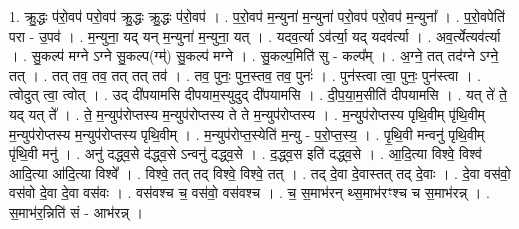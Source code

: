 \documentclass[17pt]{extarticle}
\begin{document}
1. क्रु॒द्धः प॑रो॒वप॑ परो॒वप॑ क्रु॒द्धः क्रु॒द्धः प॑रो॒वप॑ । . प॒रो॒वप॑ म॒न्युना॑ म॒न्युना॑ परो॒वप॑ परो॒वप॑ म॒न्युना᳚ । . प॒रो॒वपेति॑ परा - उ॒पव॑ । . म॒न्युना॒ यद् यन् म॒न्युना॑ म॒न्युना॒ यत् । . यदव॒र्त्या ऽव॑र्त्या॒ यद् यदव॑र्त्या । . अव॒र्त्येत्यव॑र्त्या । . सु॒कल्प॑ मग्ने ऽग्ने सु॒कल्प(ग्म्॑) सु॒कल्प॑ मग्ने । . सु॒कल्प॒मिति॑ सु - कल्प᳚म् । . अ॒ग्ने॒ तत् तद॑ग्ने ऽग्ने॒ तत् । . तत् तव॒ तव॒ तत् तत् तव॑ । . तव॒ पुनः॒ पुन॒स्तव॒ तव॒ पुनः॑ । . पुन॑स्त्वा त्वा॒ पुनः॒ पुन॑स्त्वा । . त्वोदुत् त्वा॒ त्वोत् । . उद् दी॑पयामसि दीपयाम॒स्युदुद् दी॑पयामसि । . दी॒प॒या॒म॒सीति॑ दीपयामसि । . यत् ते॑ ते॒ यद् यत् ते᳚ । . ते॒ म॒न्युप॑रोप्तस्य म॒न्युप॑रोप्तस्य ते ते म॒न्युप॑रोप्तस्य । . म॒न्युप॑रोप्तस्य पृथि॒वीम् पृ॑थि॒वीम् म॒न्युप॑रोप्तस्य म॒न्युप॑रोप्तस्य पृथि॒वीम् । . म॒न्युप॑रोप्त॒स्येति॑ म॒न्यु - प॒रो॒प्त॒स्य॒ । . पृ॒थि॒वी मन्वनु॑ पृथि॒वीम् पृ॑थि॒वी मनु॑ । . अनु॑ दद्ध्व॒से द॑द्ध्व॒से ऽन्वनु॑ दद्ध्व॒से । . द॒द्ध्व॒स इति॑ दद्ध्व॒से । . आ॒दि॒त्या विश्वे॒ विश्व॑ आदि॒त्या आ॑दि॒त्या विश्वे᳚ । . विश्वे॒ तत् तद् विश्वे॒ विश्वे॒ तत् । . तद् दे॒वा दे॒वास्तत् तद् दे॒वाः । . दे॒वा वस॑वो॒ वस॑वो दे॒वा दे॒वा वस॑वः । . वस॑वश्च च॒ वस॑वो॒ वस॑वश्च । . च॒ स॒माभ॑रन् थ्स॒माभ॑रꣳश्च च स॒माभ॑रन्न् । . स॒माभ॑र॒न्निति॑ सं - आभ॑रन्न् । \newline
\end{document}
